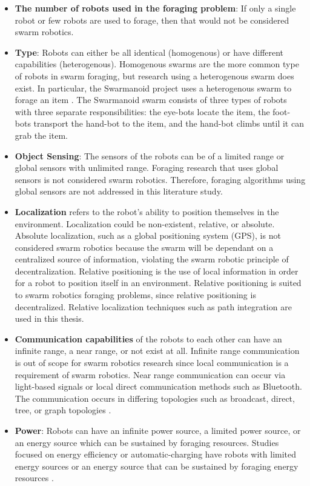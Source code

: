 \begin{itemize}
\item \textbf{The number of robots used in the foraging problem}: If only a single robot or few robots are used to forage, then that would not be considered swarm robotics.

\item \textbf{Type}: Robots can either be all identical (homogenous) or have different capabilities (heterogenous). Homogenous swarms are the more common type of robots in swarm foraging, but research using a heterogenous swarm does exist. In particular, the Swarmanoid project uses a heterogenous swarm to forage an item \cite{dorigo2013swarmanoid}. The Swarmanoid swarm consists of three types of robots with three separate responsibilities: the eye-bots locate the item, the foot-bots transport the hand-bot to the item, and the hand-bot climbs until it can grab the item. 

\item \textbf{Object Sensing}: The sensors of the robots can be of a limited range or global sensors with unlimited range. Foraging research that uses global sensors is not considered swarm robotics. Therefore, foraging algorithms using global sensors are not addressed in this literature study.

\item \textbf{Localization} refers to the robot's ability to position themselves in the environment. Localization could be non-existent, relative, or absolute. Absolute localization, such as a global positioning system (GPS), is not considered swarm robotics because the swarm will be dependant on a centralized source of information, violating the swarm robotic principle of decentralization. Relative positioning is the use of local information in order for a robot to position itself in an environment. Relative positioning is suited to swarm robotics foraging problems, since relative positioning is decentralized. Relative localization techniques such as path integration are used in this thesis.

\item \textbf{Communication capabilities} of the robots to each other can have an infinite range, a near range, or not exist at all. Infinite range communication is out of scope for swarm robotics research since local communication is a requirement of swarm robotics. Near range communication can occur via light-based signals \cite{sugawara2002swarming} or local direct communication methods such as Bluetooth. The communication occurs in differing topologies such as broadcast, direct, tree, or graph topologies \cite{dudek1993taxonomy}.

\item \textbf{Power}: Robots can have an infinite power source, a limited power source, or an energy source which can be sustained by foraging resources. Studies focused on energy efficiency or automatic-charging have robots with limited energy sources or an energy source that can be sustained by foraging energy resources \cite{liu2006strategies}.

\end{itemize}

